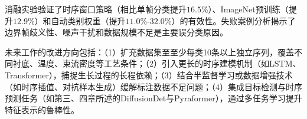 消融实验验证了时序窗口策略（相比单帧分类提升$16.5\%$）、ImageNet预训练（提升$12.9\%$）和自动类别权重（提升$11.0\%$-$32.0\%$）的有效性。失败案例分析揭示了边界帧歧义性、噪声干扰和数据规模不足是主要误分类原因。

未来工作的改进方向包括：（1）扩充数据集至至少每类10条以上独立序列，覆盖不同衬底、温度、束流密度等工艺条件；（2）引入更长的时序建模机制（如LSTM、Transformer），捕捉生长过程的长程依赖；（3）结合半监督学习或数据增强技术（如时序插值、对抗样本生成）缓解标注数据不足问题；（4）集成目标检测与时序预测任务（如第三、四章所述的DiffusionDet与Pyraformer），通过多任务学习提升特征表示的鲁棒性。
